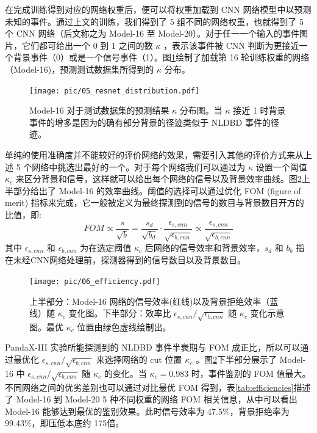 在完成训练得到对应的网络权重后，便可以将权重加载到 CNN 网络模型中以预测未知的事件。通过上文的训练，我们得到了 5 组不同的网络权重，也就得到了 5 个 CNN 网络（后文称之为 Model-16 至 Model-20）。对于任一一个输入的事件图片，它们都可给出一个 0 到 1 之间的数 $\kappa$ ，表示该事件被 CNN 判断为更接近一个背景事件（0）或是一个信号事件（1）。图\ref{fig:cnn_dis}绘制了加载第 16 轮训练权重的网络（Model-16)，预测测试数据集所得到的 $\kappa$ 分布。

\begin{figure}
    \centering
    \texttt{[image: pic/05\_resnet\_distribution.pdf]}
    \caption{Model-16 对于测试数据集的预测结果 $\kappa$ 分布图。当 $\kappa$ 接近 1 时背景事件的增多是因为的确有部分背景的径迹类似于 NLDBD 事件的径迹。}
    \label{fig:cnn_dis}
\end{figure}

单纯的使用准确度并不能较好的评价网络的效果，需要引入其他的评价方式来从上述 5 个网络中挑选出最好的一个。对于每个网络我们可以通过为 $\kappa$ 设置一个阈值 $\kappa_c$ 来区分背景和信号，这样就可以给出每个网络的信号以及背景效率曲线。图\ref{fig:cnn_eff}上半部分给出了 Model-16 的效率曲线。阈值的选择可以通过优化 FOM (figure of merit) 指标来完成，它一般被定义为最终探测到的信号的数目与背景数目开方的比值，即:
\begin{equation}
    FOM \propto \frac{s}{\sqrt{b}}=\frac{s_d}{\sqrt{b_d}}\cdot \frac{\epsilon_{s,cnn}}{\sqrt{\epsilon_{b,cnn}}}\propto \frac{\epsilon_{s,cnn}}{\sqrt{\epsilon_{b,cnn}}}
\end{equation}
其中 $\epsilon_{s,cnn}$ 和 $\epsilon_{b,cnn}$ 为在选定阈值 $\kappa_c$ 后网络的信号效率和背景效率，$s_d$ 和 $b_b$ 指在未经CNN网络处理前，探测器得到的信号数目以及背景数目。

\begin{figure}
    \centering
    \texttt{[image: pic/06\_efficiency.pdf]}
    \caption{上半部分：Model-16 网络的信号效率(红线)以及背景拒绝效率（蓝线）随 $\kappa_c$ 变化图。下半部分：效率比 $\epsilon_{s,cnn}/\sqrt{\epsilon_{b,cnn}}$ 随 $\kappa_c$ 变化示意图。最优 $\kappa_c$ 位置由绿色虚线绘制出。}
    \label{fig:cnn_eff}
\end{figure}

PandaX-III 实验所能探测到的 NLDBD 事件半衰期与 FOM 成正比，所以可以通过最优化 $\epsilon_{s,cnn}/\sqrt{\epsilon_{b,cnn}}$ 来选择网络的 cut 位置 $\kappa_c$ 。图\ref{fig:cnn_eff}下半部分展示了 Model-16 中 $\epsilon_{s,cnn}/\sqrt{\epsilon_{b,cnn}}$ 随 $\kappa_c$ 的变化。当 $\kappa_c = 0.983$ 时，事件鉴别的 FOM 值最大。不同网络之间的优劣差别也可以通过对比最优 FOM 得到，表\ref{tab:efficiencies}描述了 Model-16 到 Model-20 5 种不同权重的网络 FOM 相关信息，从中可以看出 Model-16 能够达到最优的鉴别效果。此时信号效率为 47.5\%，背景拒绝率为 99.43\%，即压低本底约 175倍。

